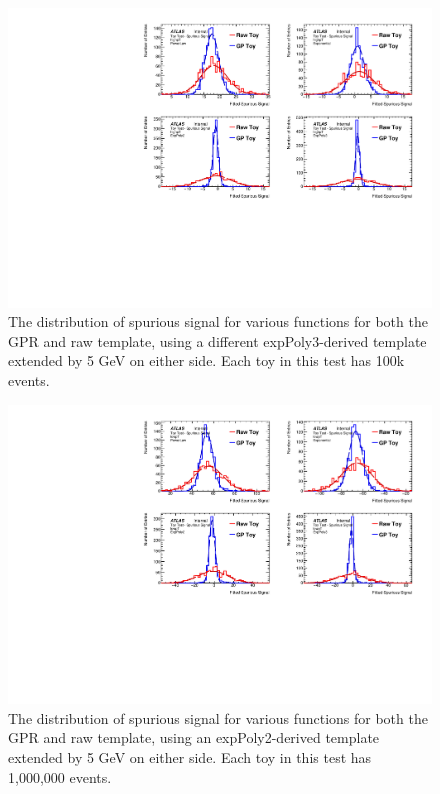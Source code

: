 \begin{figure} 
\begin{center}
  \includegraphics[width=\textwidth]{figures/background/gpr/validation/padded/ToyTest_FitSigVals_highpT_100k_noSig}   
\caption{The distribution of spurious signal for various functions for both the GPR and raw template, using a different expPoly3-derived template extended by 5 GeV on either side. Each toy in this test has 100k events.}
\label{fig:padded_highpt_100k_noSig}
\end{center}
\end{figure}

\begin{figure} 
\begin{center}
  \includegraphics[width=\textwidth]{figures/background/gpr/validation/padded/ToyTest_FitSigVals_lowpT_1M_noSig}   
\caption{The distribution of spurious signal for various functions for both the GPR and raw template, using an expPoly2-derived template extended by 5 GeV on either side. Each toy in this test has 1,000,000 events.}
\label{fig:padded_lowpt_1M_noSig}
\end{center}
\end{figure}

